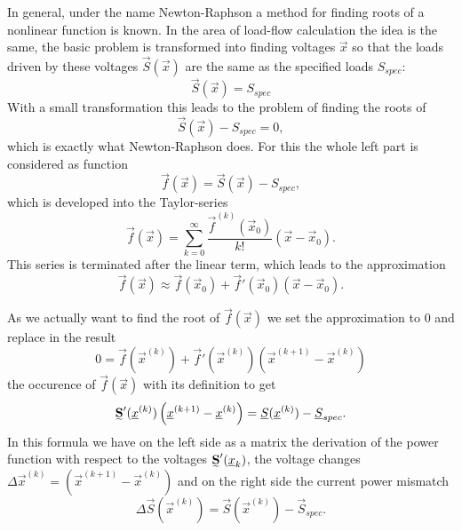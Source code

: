 In general, under the name Newton-Raphson a method for finding roots of a nonlinear function is known. In the area of load-flow calculation the idea is the same, the basic problem is transformed into finding voltages $\vec x$ so that the loads driven by these voltages $\vec S (\vec x)$ are the same as the specified loads $S_{spec}$:
\begin{equation}
	\vec S (\vec x) = S_{spec}
\end{equation}
With a small transformation this leads to the problem of finding the roots of
\begin{equation}
	\vec S (\vec x) - S_{spec} = 0,
\end{equation}
which is exactly what Newton-Raphson does. For this the whole left part is considered as function
\begin{equation}
	\vec f (\vec x) = \vec S (\vec x) - S_{spec},
\end{equation}
which is developed into the Taylor-series
\begin{equation}
	\vec f (\vec x) = \sum_{k = 0}^\infty \frac{\vec f^{(k)} (\vec x_0)}{k!} \left( \vec x - \vec x_0 \right).
\end{equation}
This series is terminated after the linear term, which leads to the approximation
\begin{equation}
	\vec f (\vec x) \approx \vec f (\vec x_0) + \vec f' (\vec x_0) \left( \vec x - \vec x_0 \right).
\end{equation}

As we actually want to find the root of $\vec f (\vec x)$ we set the approximation to 0 and replace in the result
\begin{equation}
	0 = \vec f (\vec x^{(k)}) + \vec f' (\vec x^{(k)}) \left( \vec x^{(k+1)} - \vec x^{(k)} \right)
\end{equation}
the occurence of $\vec f (\vec x)$ with its definition to get
\begin{equation}
	\mat S' (\vec x^{(k)}) \left( \vec x^{(k+1)} - \vec x^{(k)} \right) = \vec S (\vec x^{(k)}) - \vec S_{spec}.
	\label{eq:newton_raphson_equation_system}
\end{equation}
In this formula we have on the left side as a matrix the derivation of the power function with respect to the voltages $\mat S' (\vec x_k)$, the voltage changes $\Delta \vec x^{(k)} = \left( \vec x^{(k+1)} - \vec x^{(k)} \right)$ and on the right side the current power mismatch 
\begin{equation}
	\Delta \vec S (\vec x^{(k)}) = \vec S (\vec x^{(k)}) - \vec S_{spec}.
	\label{eq:power_mismatch}
\end{equation}

